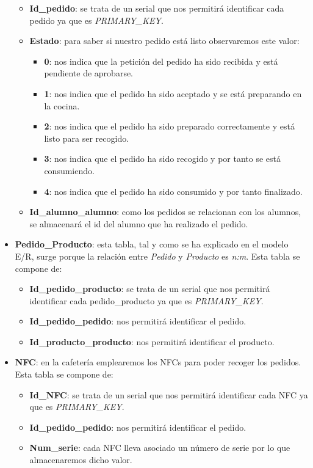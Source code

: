 \documentclass[12pt]{report}
\begin{document}
\begin{itemize}
\begin{itemize}
        \item\textbf{Id\_pedido}: se trata de un serial que nos permitirá identificar cada pedido ya que es \textit{PRIMARY\_KEY}.
        \item \textbf{Estado}: para saber si nuestro pedido está listo observaremos este valor:
        \begin{itemize}
            \item \textbf{0}: nos indica que la petición del pedido ha sido recibida y está pendiente de aprobarse.
            \item \textbf{1}: nos indica que el pedido ha sido aceptado y se está preparando en la cocina.
            \item \textbf{2}: nos indica que el pedido ha sido preparado correctamente y está listo para ser recogido.
            \item \textbf{3}: nos indica que el pedido ha sido recogido y por tanto se está consumiendo.
            \item \textbf{4}: nos indica que el pedido ha sido consumido y por tanto finalizado.
        \end{itemize}
        \item \textbf{Id\_alumno\_alumno}: como los pedidos se relacionan con los alumnos, se almacenará el id del alumno que ha realizado el pedido. 
    \\
    \end{itemize} 
    \item  \textbf{Pedido\_Producto}: esta tabla, tal y como se ha explicado en el modelo E/R, surge porque la relación entre \textit{Pedido} y \textit{Producto} es \textit{n:m}. Esta tabla se compone de:
    \begin{itemize}
        \item\textbf{Id\_pedido\_producto}: se trata de un serial que nos permitirá identificar cada pedido\_producto ya que es \textit{PRIMARY\_KEY}.
        \item\textbf{Id\_pedido\_pedido}: nos permitirá identificar el pedido.
        \item\textbf{Id\_producto\_producto}: nos permitirá identificar el producto.
        \\
    \end{itemize} 
    \item  \textbf{NFC}: en la cafetería emplearemos los NFCs para poder recoger los pedidos. Esta tabla se compone de:
    \begin{itemize}
        \item\textbf{Id\_NFC}: se trata de un serial que nos permitirá identificar cada NFC ya que es \textit{PRIMARY\_KEY}.
        \item\textbf{Id\_pedido\_pedido}: nos permitirá identificar el pedido.
        \item\textbf{Num\_serie}: cada NFC lleva asociado un número de serie por lo que almacenaremos dicho valor.
    \\
    \end{itemize} 
\end{itemize} 
\end{document}
